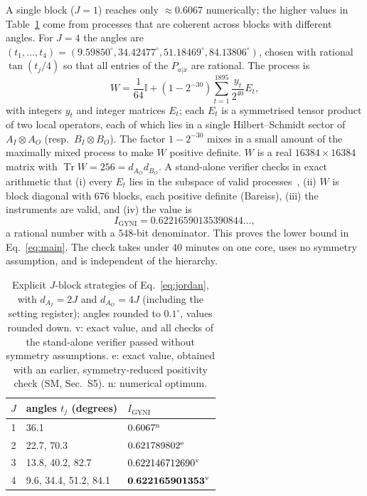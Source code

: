 \documentclass[aps,prl,twocolumn,superscriptaddress,longbibliography,nofootinbib]{revtex4-2}
\newcommand{\Tr}{\operatorname{Tr}}
\newcommand{\one}{\mathbb{I}}
\newcommand{\Igy}{I_{\mathrm{GYNI}}}
\begin{document}
A single block ($J=1$) reaches only $\approx0.6067$ numerically; the higher values in Table~\ref{tab:strategies} come from processes that are coherent across blocks with different angles. For $J=4$ the angles are $(t_1,\dots,t_4)=(9.59850^\circ,34.42477^\circ,51.18469^\circ,84.13806^\circ)$, chosen with rational $\tan(t_j/4)$ so that all entries of the $P_{a|x}$ are rational. The process is
\begin{equation}
W=\frac{1}{64}\one+(1-2^{-30})\sum_{t=1}^{1895}\frac{y_t}{2^{40}}E_t ,
\label{eq:Wexplicit}
\end{equation}
with integers $y_t$ and integer matrices $E_t$; each $E_t$ is a symmetrised tensor product of two local operators, each of which lies in a single Hilbert--Schmidt sector of $A_I\otimes A_O$ (resp.\ $B_I\otimes B_O$). The factor $1-2^{-30}$ mixes in a small amount of the maximally mixed process to make $W$ positive definite. $W$ is a real $16384\times16384$ matrix with $\Tr W=256=d_{A_O}d_{B_O}$. A stand-alone verifier checks in exact arithmetic that (i) every $E_t$ lies in the subspace of valid processes~\cite{Oreshkov2012,Araujo2015}, (ii) $W$ is block diagonal with $676$ blocks, each positive definite (Bareiss), (iii) the instruments are valid, and (iv) the value is
\begin{equation}
\Igy=0.62216590135390844\ldots ,
\end{equation}
a rational number with a $548$-bit denominator. This proves the lower bound in Eq.~\eqref{eq:main}. The check takes under $40$ minutes on one core, uses no symmetry assumption, and is independent of the hierarchy.

\begin{table}[t]
\caption{Explicit $J$-block strategies of Eq.~\eqref{eq:jordan}, with $d_{A_I}=2J$ and $d_{A_O}=4J$ (including the setting register); angles rounded to $0.1^\circ$, values rounded down. v: exact value, and all checks of the stand-alone verifier passed without symmetry assumptions. e: exact value, obtained with an earlier, symmetry-reduced positivity check (SM, Sec.~S5). n: numerical optimum.}
\label{tab:strategies}
\begin{ruledtabular}
\begin{tabular}{cll}
$J$ & angles $t_j$ (degrees) & $\Igy$\\
\hline
1 & 36.1                   & $0.6067^{\rm n}$\\
2 & 22.7, 70.3             & $0.621789802^{\rm e}$\\
3 & 13.8, 40.2, 82.7       & $0.622146712690^{\rm v}$\\
4 & 9.6, 34.4, 51.2, 84.1  & $\mathbf{0.622165901353}^{\rm v}$\\
\end{tabular}
\end{ruledtabular}
\end{table}
\end{document}
